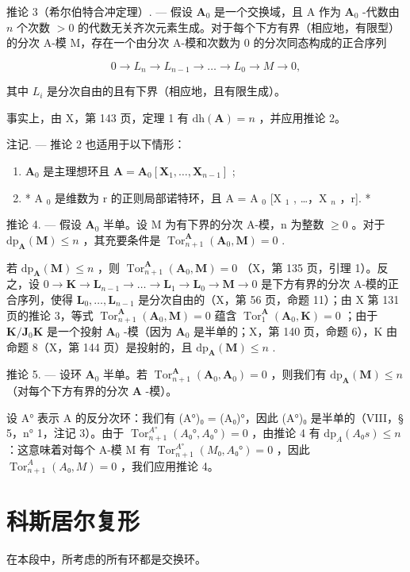 推论 3（希尔伯特合冲定理）. --- 假设 \(\mathbf{A}_0\) 是一个交换域，且 A 作为 \(\mathbf{A}_0\) -代数由 \(n\) 个次数 \(>0\) 的代数无关齐次元素生成。对于每个下方有界（相应地，有限型）的分次 A-模 M，存在一个由分次 A-模和次数为 0 的分次同态构成的正合序列

\[
0 \rightarrow L _ {n} \rightarrow L _ {n - 1} \rightarrow \dots \rightarrow L _ {0} \rightarrow M \rightarrow 0,
\]

其中 \(L_{i}\) 是分次自由的且有下界（相应地，且有限生成）。

事实上，由 X，第 143 页，定理 1 有 \(\mathrm{dh}(\mathbf{A}) = n\) ，并应用推论 2。

注记. --- 推论 2 也适用于以下情形：

\begin{enumerate}
\def\labelenumi{\alph{enumi})}
\item
  \(\mathbf{A}_0\) 是主理想环且 \(\mathbf{A} = \mathbf{A}_0[\mathbf{X}_1, \dots, \mathbf{X}_{n-1}]\) ;
\item
  * A \(_{0}\) 是维数为 r 的正则局部诺特环，且 A = A \(_{0}\) {[}X \(_{1}\) , \ldots，X \(_{n}\) ，r{]}. *
\end{enumerate}

推论 4. --- 假设 \(\mathbf{A}_{0}\) 半单。设 M 为有下界的分次 A-模，n 为整数 \(\geqslant 0\) 。对于 \(\mathrm{dp}_{\mathbf{A}}(\mathbf{M}) \leqslant n\) ，其充要条件是 \(\operatorname{Tor}_{n+1}^{\mathbf{A}}(\mathbf{A}_{0}, \mathbf{M}) = 0\) .

若 \(\mathrm{dp}_{\mathbf{A}}(\mathbf{M}) \leqslant n\) ，则 \(\operatorname{Tor}_{n+1}^{\mathbf{A}}(\mathbf{A}_0, \mathbf{M}) = 0\) （X，第 135 页，引理 1）。反之，设 \(0 \to \mathbf{K} \to \mathbf{L}_{n-1} \to \ldots \to \mathbf{L}_1 \to \mathbf{L}_0 \to \mathbf{M} \to 0\) 是下方有界的分次 A-模的正合序列，使得 \(\mathbf{L}_0, \ldots, \mathbf{L}_{n-1}\) 是分次自由的（X，第 56 页，命题 11）；由 X 第 131 页的推论 3，等式 \(\operatorname{Tor}_{n+1}^{\mathbf{A}}(\mathbf{A}_0, \mathbf{M}) = 0\) 蕴含 \(\operatorname{Tor}_1^{\mathbf{A}}(\mathbf{A}_0, \mathbf{K}) = 0\) ；由于 \(\mathbf{K} / \mathbf{J}_0\mathbf{K}\) 是一个投射 \(\mathbf{A}_0\) -模（因为 \(\mathbf{A}_0\) 是半单的；X，第 140 页，命题 6），K 由命题 8（X，第 144 页）是投射的，且 \(\mathrm{dp}_{\mathbf{A}}(\mathbf{M}) \leqslant n\) .

推论 5. --- 设环 \(\mathbf{A}_0\) 半单。若 \(\operatorname{Tor}_{n+1}^{\mathbf{A}}(\mathbf{A}_0, \mathbf{A}_0) = 0\) ，则我们有 \(\mathrm{dp}_{\mathbf{A}}(\mathbf{M}) \leqslant n\) （对每个下方有界的分次 \(\mathbf{A}\) -模）。

设 A° 表示 A 的反分次环：我们有 (A°)₀ = (A₀)°，因此 (A°)₀ 是半单的（VIII，§ 5，n° 1，注记 3）。由于 \(\operatorname{Tor}_{n+1}^{A°}(A₀°, A₀°) = 0\) ，由推论 4 有 \(\mathrm{dp}_A(A₀s) \leqslant n\) ：这意味着对每个 A-模 M 有 \(\operatorname{Tor}_{n+1}^{A°}(M₀, A₀°) = 0\) ，因此 \(\operatorname{Tor}_{n+1}^{A}(A₀, M) = 0\) ，我们应用推论 4。

\section{科斯居尔复形}

在本段中，所考虑的所有环都是交换环。
